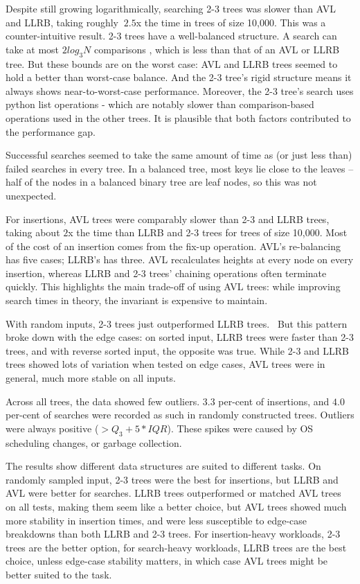 \documentclass[12pt]{article}
\begin{document}
Despite still growing logarithmically, searching 2-3 trees was slower than AVL and LLRB, taking roughly $~2.5$x the time in trees of size 10,000. This was a counter-intuitive result. 2-3 trees have a well-balanced structure. A search can take at most $2log_3N$ comparisons \cite{algorithms}, which is less than that of an AVL or LLRB tree. But these bounds are on the worst case: AVL and LLRB trees seemed to hold a better than worst-case balance. And the 2-3 tree’s rigid structure means it always shows near-to-worst-case performance. Moreover, the 2-3 tree’s search uses python list operations - which are notably slower than comparison-based operations used in the other trees. It is plausible that both factors contributed to the performance gap.

Successful searches seemed to take the same amount of time as (or just less than) failed searches in every tree. In a balanced tree, most keys lie close to the leaves – half of the nodes in a balanced binary tree are leaf nodes, so this was not unexpected. 

For insertions, AVL trees were comparably slower than 2-3 and LLRB trees, taking about $2$x the time than LLRB and 2-3 trees for trees of size 10,000. Most of the cost of an insertion comes from the fix-up operation. AVL’s re-balancing has five cases; LLRB's has three. AVL recalculates heights at every node on every insertion, whereas LLRB and 2-3 trees' chaining operations often terminate quickly. This highlights the main trade-off of using AVL trees: while improving search times in theory, the invariant is expensive to maintain.

With random inputs, 2-3 trees just outperformed LLRB trees.  But this pattern broke down with the edge cases: on sorted input, LLRB trees were faster than 2-3 trees, and with reverse sorted input, the opposite was true.  While 2-3 and LLRB trees showed lots of variation when tested on edge cases, AVL trees were in general, much more stable on all inputs.

Across all trees, the data showed few outliers. $3.3$ per-cent of  insertions, and $4.0$ per-cent of searches were recorded as such in randomly constructed trees. Outliers were always positive ($> Q_3 + 5*IQR$). These spikes were caused by OS scheduling changes, or garbage collection. 

The results show different data structures are suited to different tasks. On randomly sampled input, 2-3 trees were the best for insertions, but LLRB and AVL were better for searches. LLRB trees outperformed or matched AVL trees on all tests, making them seem like a better choice, but AVL trees showed much more stability in insertion times, and were less susceptible to edge-case breakdowns than both LLRB and 2-3 trees. For insertion-heavy workloads, 2-3 trees are the better option, for search-heavy workloads, LLRB trees are the best choice, unless edge-case stability matters, in which case AVL trees might be better suited to the task.
\vspace{-1em}
\end{document}

